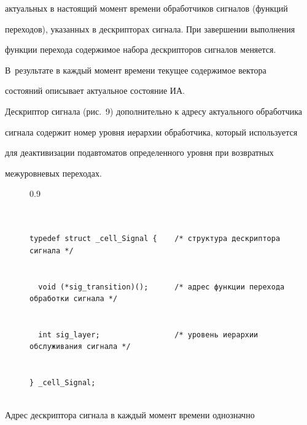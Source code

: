актуальных в настоящий момент времени обработчиков сигналов (функций 


переходов), указанных в дескрипторах сигнала. При завершении выполнения 


функции перехода содержимое набора дескрипторов сигналов меняется. 


В~результате в каждый момент времени текущее содержимое вектора 


состояний описывает актуальное состояние ИА. 


Дескриптор сигнала (рис.~9) дополнительно к адресу актуального обработчика 


сигнала содержит номер уровня иерархии обработчика, который используется 


для деактивизации подавтоматов определенного уровня при возвратных 


межуровневых переходах.


      





\begin{figure}\scriptsize %


\begin{center}


\begin{fmpage}{0.9\textwidth}


\begin{verbatim}


typedef struct _cell_Signal {    /* структура дескриптора сигнала */ 


  void (*sig_transition)();      /* адрес функции перехода обработки сигнала */ 


  int sig_layer;                 /* уровень иерархии обслуживания сигнала */ 


} _cell_Signal;


\end{verbatim}


\end{fmpage}


\end{center}


\vspace*{-6pt}




\end{figure}





      Адрес дескриптора сигнала в каждый момент времени однозначно 


